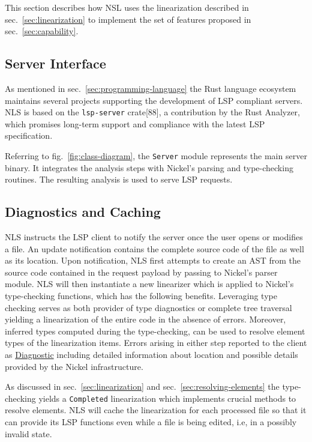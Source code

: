 \documentclass[
  a4paper,
  bibtex,
  english,
  nomenclature]{kthlatex/kththesis/kththesis}
\begin{document}
This section describes how NSL uses the linearization described in
sec.~\ref{sec:linearization} to implement the set of features proposed
in sec.~\ref{sec:capability}.

\hypertarget{sec:server-interface}{%
\subsection{Server Interface}\label{sec:server-interface}}

As mentioned in sec.~\ref{sec:programming-language} the Rust language
ecosystem maintains several projects supporting the development of LSP
compliant servers. NLS is based on the \texttt{lsp-server}
crate{[}88{]}, a contribution by the Rust Analyzer, which promises
long-term support and compliance with the latest LSP specification.

Referring to fig.~\ref{fig:class-diagram}, the \texttt{Server} module
represents the main server binary. It integrates the analysis steps with
Nickel's parsing and type-checking routines. The resulting analysis is
used to serve LSP requests.

\hypertarget{sec:diagnostics-and-caching}{%
\subsection{Diagnostics and Caching}\label{sec:diagnostics-and-caching}}

NLS instructs the LSP client to notify the server once the user opens or
modifies a file. An update notification contains the complete source
code of the file as well as its location. Upon notification, NLS first
attempts to create an AST from the source code contained in the request
payload by passing to Nickel's parser module. NLS will then instantiate
a new linearizer which is applied to Nickel's type-checking functions,
which has the following benefits. Leveraging type checking serves as
both provider of type diagnostics or complete tree traversal yielding a
linearization of the entire code in the absence of errors. Moreover,
inferred types computed during the type-checking, can be used to resolve
element types of the linearization items. Errors arising in either step
reported to the client as
\href{https://microsoft.github.io/language-server-protocol/specifications/specification-current/\#diagnostic}{Diagnostic}
including detailed information about location and possible details
provided by the Nickel infrastructure.

As discussed in sec.~\ref{sec:linearization} and
sec.~\ref{sec:resolving-elements} the type-checking yields a
\texttt{Completed} linearization which implements crucial methods to
resolve elements. NLS will cache the linearization for each processed
file so that it can provide its LSP functions even while a file is being
edited, i.e, in a possibly invalid state.
\end{document}

